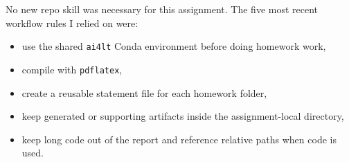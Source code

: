 \documentclass{article}
\begin{document}
No new repo skill was necessary for this assignment. The five most recent workflow rules I relied on were:
\begin{itemize}
\item use the shared \verb|ai4lt| Conda environment before doing homework work,
\item compile with \verb|pdflatex|,
\item create a reusable statement file for each homework folder,
\item keep generated or supporting artifacts inside the assignment-local directory,
\item keep long code out of the report and reference relative paths when code is used.
\end{itemize}
\end{document}
